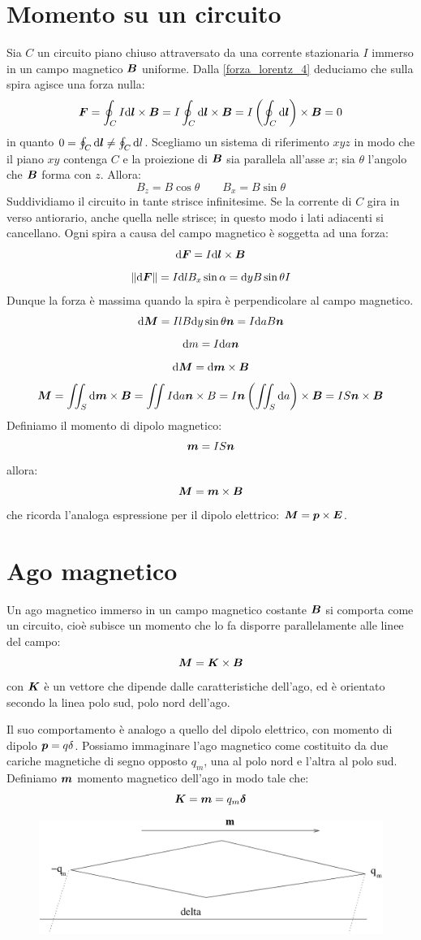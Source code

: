 \section{Momento su un circuito}
Sia $C$ un circuito piano chiuso attraversato da una corrente stazionaria $I$ immerso in un campo magnetico $\boldsymbol{B}$ uniforme. Dalla \eqref{forza_lorentz_4} deduciamo che sulla spira agisce una forza nulla:
\[\boldsymbol{F}=\oint_C I\mathrm{d}\boldsymbol{l}\times\boldsymbol{B}=I\oint_C\mathrm{d} \boldsymbol{l}\times\boldsymbol{B}=I\left(\oint_C\mathrm{d}\boldsymbol{l}\right)\times\boldsymbol{B}=0\]
in quanto $0=\oint_C \mathrm{d} \boldsymbol{l}\neq\oint_C\mathrm{d} l$. Scegliamo un sistema di riferimento $xyz$ in modo che il piano $xy$ contenga $C$ e la proiezione di $\boldsymbol{B}$ sia parallela all'asse $x$; sia $\theta$ l'angolo che $\boldsymbol{B}$ forma con $z$. Allora:
\[B_z=B\cos\theta\qquad B_x=B\sin\theta\]
Suddividiamo il circuito in tante strisce infinitesime. Se la corrente di $C$ gira in verso antiorario, anche quella nelle strisce; in questo modo i lati adiacenti si cancellano. Ogni spira a causa del campo magnetico è soggetta ad una forza:
\[\mathrm{d}\boldsymbol{F}=I\mathrm{d}\boldsymbol{l}\times\boldsymbol{B}\]
\[\left\lVert\mathrm{d}\boldsymbol{F}\right\rVert=I\mathrm{d} lB_x\sin\alpha=\mathrm{d} yB\sin\theta I\]
Dunque la forza è massima quando la spira è perpendicolare al campo magnetico.
\[\mathrm{d} \boldsymbol{M}=IlB\mathrm{d} y\sin\theta\boldsymbol{n}=I\mathrm{d} a B\boldsymbol{n}\]
\[\mathrm{d} m=I\mathrm{d} a\boldsymbol{n}\]
\[\mathrm{d}\boldsymbol{M}=\mathrm{d}\boldsymbol{m}\times\boldsymbol{B}\]
\[\boldsymbol{M}=\iint_S\mathrm{d}\boldsymbol{m}\times \boldsymbol{B}=\iint I\mathrm{d} a\boldsymbol{n}\times B=I\boldsymbol{n}\left(\iint_S\mathrm{d} a\right)\times \boldsymbol{B}=IS\boldsymbol{n}\times \boldsymbol{B}\]
Definiamo il momento di dipolo magnetico:
\begin{equation}
  \boldsymbol{m}=IS\boldsymbol{n}
  \label{eq:dipolo_magnetico}
\end{equation}
allora:
\[\boldsymbol{M}=\boldsymbol{m}\times \boldsymbol{B}\]
che ricorda l'analoga espressione per il dipolo elettrico: $\boldsymbol{M}=\boldsymbol{p}\times\boldsymbol{E}$.
\section{Ago magnetico}
Un ago magnetico immerso in un campo magnetico costante $\boldsymbol{B}$ si comporta come un circuito, cioè subisce un momento che lo fa disporre parallelamente alle linee del campo:
\[\boldsymbol{M}=\boldsymbol{K}\times\boldsymbol{B}\]
con $\boldsymbol{K}$ è un vettore che dipende dalle caratteristiche dell'ago, ed è orientato secondo la linea polo sud, polo nord dell'ago.

Il suo comportamento è analogo a quello del dipolo elettrico, con momento di dipolo $\boldsymbol{p}=q\delta$. Possiamo immaginare l'ago magnetico come costituito da due cariche magnetiche di segno opposto $q_m$, una al polo nord e l'altra al polo sud. Definiamo $\boldsymbol{m}$ momento magnetico dell'ago in modo tale che:
\[\boldsymbol{K}=\boldsymbol{m}=q_m \boldsymbol{\delta}\]
\begin{figure}[htbp]
  \centering
  \includegraphics[scale=0.5]{immagini/fisica2/ago}
\end{figure}
